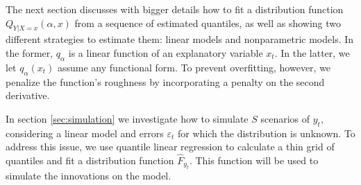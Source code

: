 The next section discusses with bigger details how to fit a distribution function $Q_{Y|X=x}(\alpha,x)$ from a sequence of estimated quantiles, as well as showing two different strategies to estimate them: linear models and nonparametric models. In the former, $q_\alpha$ is a linear function of an explanatory variable $x_t$.
In the latter, we let $q_\alpha(x_t)$ assume any functional form. To prevent overfitting, however, we penalize the function's roughness by incorporating a penalty on the second derivative.

In section \ref{sec:simulation} we investigate how to simulate $S$ scenarios of $y_t$, considering a linear model and errors $\varepsilon_t$ for which the distribution is unknown. To address this issue, we use quantile linear regression to calculate a thin grid of quantiles and fit a distribution function $\hat{F}_{y_t}$. This function will be used to simulate the innovations on the model.


